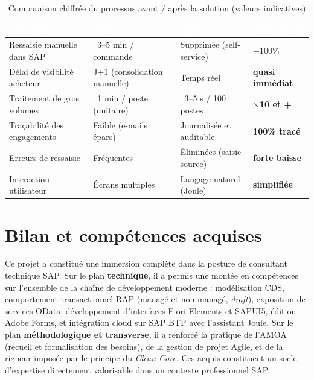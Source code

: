 \documentclass[12pt,a4paper,oneside]{report}
\begin{document}
\begin{table}[H]
\centering
\footnotesize
\renewcommand{\arraystretch}{1.4}
\setlength{\tabcolsep}{6pt}
\renewcommand{\tabularxcolumn}[1]{m{#1}}
\begin{tabularx}{\textwidth}{>{\raggedright\arraybackslash}m{3.6cm} >{\raggedright\arraybackslash}X >{\raggedright\arraybackslash}X >{\centering\arraybackslash}m{2.4cm}}
\toprule
\rowcolor{RoyalBlue!65}
\textcolor{white}{\textbf{Indicateur}} & \textcolor{white}{\textbf{Avant}} & \textcolor{white}{\textbf{Après}} & \textcolor{white}{\textbf{Gain estimé}} \\
\midrule
Ressaisie manuelle dans SAP & ~3--5 min / commande & Supprimée (self-service) & \textbf{$-100\%$} \\
Délai de visibilité acheteur & J+1 (consolidation manuelle) & Temps réel & \textbf{quasi immédiat} \\
Traitement de gros volumes & ~1 min / poste (unitaire) & ~3--5 s / 100 postes & \textbf{$\times$10 et +} \\
Traçabilité des engagements & Faible (e-mails épars) & Journalisée et auditable & \textbf{100\% tracé} \\
Erreurs de ressaisie & Fréquentes & Éliminées (saisie source) & \textbf{forte baisse} \\
Interaction utilisateur & Écrans multiples & Langage naturel (Joule) & \textbf{simplifiée} \\
\bottomrule
\end{tabularx}
\caption{Comparaison chiffrée du processus avant / après la solution (valeurs indicatives)}
\label{tab:benefices}
\end{table}

\section{Bilan et compétences acquises}\label{ch5:bilan}
Ce projet a constitué une immersion complète dans la posture de consultant technique SAP.
Sur le plan \textbf{technique}, il a permis une montée en compétences sur l'ensemble de la
chaîne de développement moderne : modélisation CDS, comportement transactionnel RAP
(managé et non managé, \textit{draft}), exposition de services OData, développement
d'interfaces Fiori Elements et SAPUI5, édition Adobe Forms, et intégration cloud sur SAP BTP
avec l'assistant Joule. Sur le plan \textbf{méthodologique et transverse}, il a renforcé la
pratique de l'AMOA (recueil et formalisation des besoins), de la gestion de projet Agile,
et de la rigueur imposée par le principe du \textit{Clean Core}. Ces acquis constituent un
socle d'expertise directement valorisable dans un contexte professionnel SAP.
\end{document}
